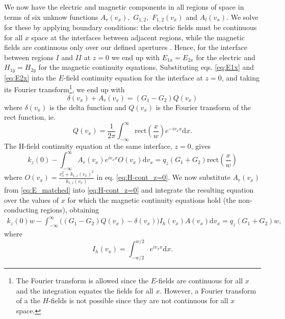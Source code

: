 We now have the electric and magnetic components in all regions of space in terms of six unknow functions $A_r(v_x),$ $G_{1,2},$ $F_{1,2}(v_x)$ and $A_t(v_x)$. We solve for these by applying boundary conditions: the electric fields must be continuous for all $x$ space at the interfaces between adjacent regions, while the magnetic fields are continuous only over our defined apertures  \cite{Modal.Match, Pendry.Modal}. Hence, for the interface between regions $I$ and $II$ at $z=0$ we end up with $E_{1x}=E_{2x}$ for the electric and $H_{1y}=H_{2y}$ for the magnetic continuity equations. Substituting eqs. \eqref{eq:E1x} and \eqref{eq:E2x} into the $E$-field continuity equation for the interface at $z=0$, and taking its Fourier transform\footnote{The Fourier transform is allowed since the $E$-fields are continuous for all $x$ and the integration equates the fields for all $x$. However, a Fourier transform of a the $H$-fields is not possible since they are not continuous for all $x$ space.}, we end up with
\begin{equation} %
\delta(v_x)+A_r(v_x)= \left(G_{1}-G_{2}\right)Q(v_x)
\label{eq:E_matched}
\end{equation}
where $\delta(v_x)$ is the delta function and $Q(v_x)$ is the Fourier transform of the rect function, ie.
\begin{equation}
Q(v_x) =\frac{1}{2\pi}\int_{-\infty}^{\infty} \text{rect}\left(\frac{x}{w}\right) e^{-iv_x x} \text{d}x.
\label{eq:Qp}
\end{equation}
The H-field continuity equation at the same interface, $z=0$, gives
\begin{equation}%
k_z(0) - \int_{-\infty}^{\infty}A_r(v_x)e^{iv_x x} O(v_x)\text{d}v_x=
q_{z}\left(G_{1}+G_{2}\right) \text{rect}\left(\frac{x}{w}\right)
\label{eq:H-cont_z=0} 
\end{equation}
where $O(v_x)=\frac{v_x^2+k_{1,z}(v_x)^2}{k_{1,z}(v_x)}$ in eq. \eqref{eq:H-cont_z=0}. We now substitute $A_r(v_x)$ from \eqref{eq:E_matched} into \eqref{eq:H-cont_z=0} and integrate the resulting equation over the values of $x$ for which the magnetic continuity equations hold (the non-conducting regions), obtaining
\begin{multline}
k_z(0)w - \int_{-\infty}^{\infty}\bigg(\left(G_{1}-G_{2}\right)Q(v_x)- \delta(v_x) \bigg) 
I_h(v_x)  A(v_x)\text{d}v_x=q_{z}\left(G_{1}+G_{2}\right) w,
\label{eq:H1xmatched}
\end{multline}
where
\begin{equation}
I_h(v_x) =\int_{-w/2}^{w/2}e^{i v_x x}\text{d}x.
\label{eq:Hm}
\end{equation} 
